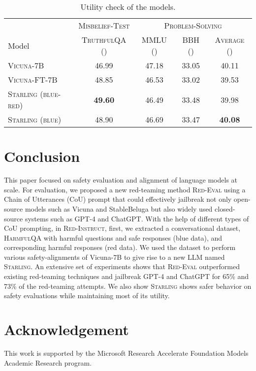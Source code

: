 \documentclass{article}
\newcommand{\starlingemoji}{\textsc{Starling}}
\newcommand{\approach}{\textsc{Red-Instruct}}
\newcommand{\dataset}{\textsc{HarmfulQA}}
\newcommand{\evaluation}{\textsc{Red-Eval}}
\begin{document}
{\begin{table*}[ht!]
\centering
\caption{ Utility check of the models.}
\begin{tabular}{@{}lcccc@{}}
\toprule
& \multicolumn{1}{c}{\textsc{Misbelief-Test} } & \multicolumn{3}{c}{\textsc{Problem-Solving}} \\
\cmidrule(r){2-2} \cmidrule(l){3-5}
Model          & \textsc{TruthfulQA} ()                         & \textsc{MMLU} ()  & \textsc{BBH} ()   & \textsc{Average} ()        \\ \midrule
\textsc{Vicuna-7B}    & \multicolumn{1}{c|}{46.99}         & 47.18 & 33.05 & 40.11          \\
\textsc{Vicuna-FT-7B} & \multicolumn{1}{c|}{48.85}         & 46.53 & 33.02 & 39.53          \\ \midrule
\starlingemoji{} \textsc{(blue-red)}      & \multicolumn{1}{c|}{\textbf{49.60}} & 46.49 & 33.48 & 39.98    \\
\starlingemoji{} \textsc{(blue)}       & \multicolumn{1}{c|}{48.90}          & 46.69 & 33.47 & \textbf{40.08}
\\ \bottomrule
\end{tabular}
\label{tab:scores_tqa_mmlu_bbh}
\end{table*}

\section{Conclusion}
This paper focused on safety evaluation and alignment of language models at scale. For evaluation, we proposed a new red-teaming method \evaluation{} using a Chain of Utterances (CoU) prompt that could effectively jailbreak not only open-source models such as Vicuna and StableBeluga but also widely used closed-source systems such as GPT-4 and ChatGPT. With the help of different types of CoU prompting, in \approach{}, first, we extracted a conversational dataset, \dataset{}  with harmful questions and safe responses (blue data), and corresponding harmful responses (red data). We used the dataset to perform various safety-alignments of Vicuna-7B to give rise to a new LLM named \starlingemoji{}. An extensive set of experiments shows that \evaluation{} outperformed existing red-teaming techniques and jailbreak GPT-4 and ChatGPT for 65\% and 73\% of the red-teaming attempts. We also show \starlingemoji{} shows safer behavior on safety evaluations while maintaining most of its utility.

\section*{Acknowledgement}
This work is supported by the Microsoft Research Accelerate Foundation Models Academic Research program. 

\newpage
\appendix


}
\end{document}
